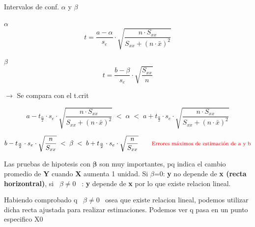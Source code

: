 \documentclass[12pt,a4paper]{article}
\begin{document}
\vspace{2pt}
Intervalos de conf. $\alpha$ y $\beta$

\begin{center}
\begin{minipage}{0.36\linewidth}
\begin{center}
$\alpha$
\[
t = \frac{a-\alpha}{s_e}\cdot \sqrt{\frac{n\cdot S_{xx}}{S_{xx}+(n\cdot\bar{x})^2}}
\]
\end{center}
\end{minipage}
\begin{minipage}{0.26\linewidth}
\begin{center}
$\beta$
\[
t = \frac{b-\beta}{s_e}\cdot \sqrt{\frac{S_{xx}}{n}}
\]
\end{center}
\end{minipage}
\begin{minipage}{0.34\linewidth}
$\longrightarrow$ Se compara con el t.crit
\end{minipage}
\end{center}

\[
a - t_{\frac{\alpha}{2}}\cdot s_e\cdot\sqrt{\frac{n\cdot S_{xx}}{S_{xx}+(n\cdot\bar{x})^2}}
\;<\; \alpha \;<\;
a + t_{\frac{\alpha}{2}}\cdot s_e\cdot\sqrt{\frac{n\cdot S_{xx}}{S_{xx}+(n\cdot\bar{x})^2}}
\]

\[
b - t_{\frac{\alpha}{2}}\cdot s_e\cdot\sqrt{\frac{n}{S_{xx}}}
\;<\; \beta \;<\;
b + t_{\frac{\alpha}{2}}\cdot s_e\cdot\sqrt{\frac{n}{S_{xx}}}
\qquad
\textcolor{red}{\text{\footnotesize Errores máximos de estimación de a y b}}
\]

Las pruebas de hipotesis con \textbf{$\boldsymbol{\beta}$} son muy importantes, pq indica el cambio promedio de \textbf{Y} cuando \textbf{X} aumenta 1 unidad. Si $\beta$=0: \textbf{y} no depende de \textbf{x (recta horizontral)}, si \ $\beta \neq 0$ \ : \textbf{y} depende de \textbf{x} por lo que existe relacion lineal.

Habiendo comprobado q \ $\beta \neq 0$ \ osea que existe relacion lineal, podemos utilizar dicha recta ajustada para realizar estimaciones. Podemos ver q pasa en un punto especifico X0
\end{document}

